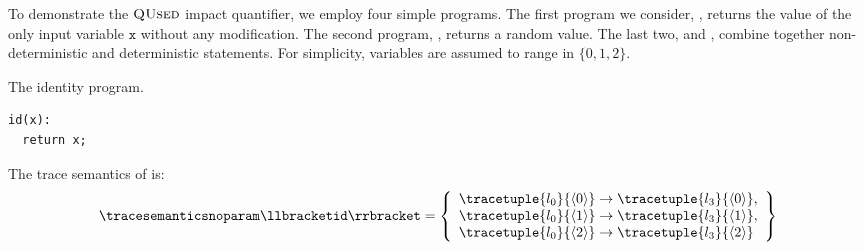 \begin{example}
  To demonstrate the $\textup{\textsc{QUsed}}$ impact quantifier, we employ four simple programs.
  The first program we consider, , returns the value of the only input variable $\texttt{x}$ without any modification.
  The second program, , returns a random value.
  The last two,  and , combine together non-deterministic and deterministic statements.
  For simplicity, variables are assumed to range in $\{0, 1, 2\}$.

  \begin{marginlisting}
    \caption{The identity program.}
    \vspace{15pt}
  \begin{lstlisting}[style=mystyle,language=customPython]
id(x):
  return x;
 \end{lstlisting}
  \end{marginlisting}
  The trace semantics of  is:
  \begin{align*}
    \tracesemanticsnoparam\semanticsof{\texttt{id}}
    =
    \left\{
      \begin{array}{l}
        \tracetuple{\locinit}{\langle 0\rangle}\rightarrow\tracetuple{\loc{3}}{\langle 0\rangle},\\
        \tracetuple{\locinit}{\langle 1\rangle}\rightarrow\tracetuple{\loc{3}}{\langle 1\rangle},\\
        \tracetuple{\locinit}{\langle 2\rangle}\rightarrow\tracetuple{\loc{3}}{\langle 2\rangle}
      \end{array}
    \right\}
  \end{align*}
  \begin{marginfigure}[*-1.5]
\end{marginfigure}
\end{example}
